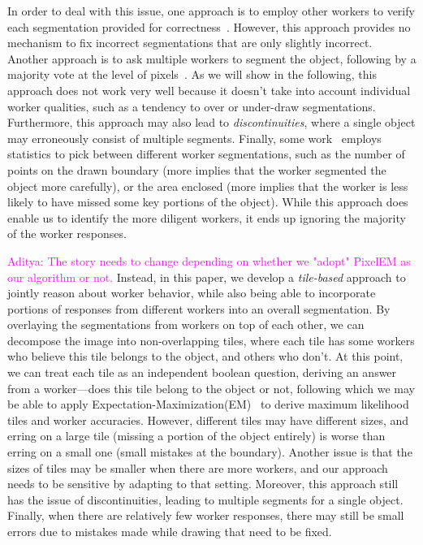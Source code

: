 \documentclass[letterpaper]{article} %
\newcommand{\agp}[1]{\textcolor{magenta}{Aditya: #1}}
\begin{document}
In order to deal with this issue, one approach
is to employ other workers to verify each segmentation 
provided for correctness~\cite{imagenet, mscoco, 
crowdsourcing-annotations}.
However, this approach provides 
no mechanism to fix incorrect
segmentations that are only slightly incorrect.
Another approach is to ask multiple workers to segment the object,
following by a 
majority vote at the level of pixels~\cite{xxx}.
As we will show in the following, 
this approach does not work very well
because it doesn't take into account 
individual worker qualities,
such as a tendency to over or under-draw segmentations.
Furthermore, this approach may also lead to {\em discontinuities},
where a single object may erroneously consist of multiple segments.
Finally, some work~\cite{Vittayakorn2011} employs statistics
to pick between different worker segmentations, 
such as the number of points on the 
drawn boundary (more implies
that the worker segmented the object more carefully),
or the area enclosed (more implies 
that the worker is less likely
to have missed some key portions of the object). 
While this approach does enable us to identify
the more diligent workers, it ends up ignoring
the majority of the worker responses. 


\agp{The story needs to change depending on whether we "adopt" PixelEM as
our algorithm or not.}
Instead, in this paper, we develop a 
{\em tile-based} approach to jointly reason about
worker behavior, while also being able to incorporate
portions of responses from different workers into
an overall segmentation.
By overlaying the segmentations from workers 
on top of each other, we
can decompose the image into non-overlapping tiles,
where each tile has some workers who believe this tile
belongs to the object, and others who don't.
At this point, we can treat each tile as an independent
boolean question, deriving an answer from a worker---does
this tile belong to the object or not, following
which we may be able to apply Expectation-Maximization(EM)~\cite{Dawid1979}
to derive maximum likelihood tiles and worker accuracies.
However, different tiles may have different sizes,
and erring on a large tile (missing a portion of the object
entirely) is worse than erring on a small
one (small mistakes at the boundary). 
Another issue is that the sizes of tiles may be 
smaller when there are more workers, and our
approach needs to be sensitive by adapting to that setting. 
Moreover, this approach still has the issue of discontinuities,
leading to multiple segments for a single object. 
Finally, when there are relatively few worker responses,
there may still be small errors due to mistakes made
while drawing that need to be fixed. 
\end{document}
